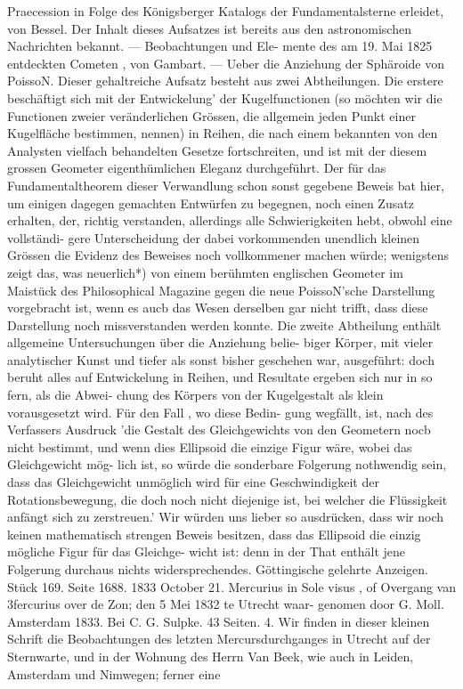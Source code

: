 \documentclass[12pt,a4paper]{article}
\begin{document}
{{{{{{{{Praecession  in  Folge  des  Königsberger  Katalogs  der  Fundamentalsterne  erleidet,  von  Bessel.  Der  Inhalt dieses  Aufsatzes  ist  bereits  aus  den  astronomischen  Nachrichten  bekannt.  ---  Beobachtungen  und  Ele- mente des  am  19.  Mai  1825  entdeckten  Cometen ,  von  Gambart. ---  Ueber  die  Anziehung  der  Sphäroide von  PoissoN.  Dieser  gehaltreiche  Aufsatz  besteht  aus  zwei  Abtheilungen.  Die  erstere  beschäftigt  sich mit  der  Entwickelung'  der  Kugelfunctionen  (so  möchten  wir  die  Functionen  zweier  veränderlichen  Grössen, die  allgemein  jeden  Punkt  einer  Kugelfläche  bestimmen,  nennen)  in  Reihen,  die  nach  einem  bekannten von  den  Analysten  vielfach  behandelten  Gesetze  fortschreiten,  und  ist  mit  der  diesem  grossen  Geometer eigenthümlichen  Eleganz  durchgeführt.  Der  für  das  Fundamentaltheorem  dieser  Verwandlung  schon sonst  gegebene  Beweis  bat  hier,  um  einigen  dagegen  gemachten  Entwürfen  zu  begegnen,  noch  einen Zusatz  erhalten,  der,  richtig  verstanden,  allerdings  alle  Schwierigkeiten  hebt,  obwohl  eine  vollständi- gere Unterscheidung  der  dabei  vorkommenden  unendlich  kleinen  Grössen  die  Evidenz  des  Beweises  noch vollkommener  machen  würde;  wenigstens  zeigt  das,  was  neuerlich*)  von  einem  berühmten  englischen Geometer  im  Maistück  des  Philosophical  Magazine  gegen  die  neue  PoissoN'sche  Darstellung  vorgebracht ist,  wenn  es  aucb  das  Wesen  derselben  gar  nicht  trifft,  dass  diese  Darstellung  noch  missverstanden werden  konnte.  Die  zweite  Abtheilung  enthält  allgemeine  Untersuchungen  über  die  Anziehung  belie- biger Körper,  mit  vieler  analytischer  Kunst  und  tiefer  als  sonst  bisher  geschehen  war,  ausgeführt:  doch beruht  alles  auf  Entwickelung  in  Reihen,  und  Resultate  ergeben  sich  nur  in  so  fern,  als  die  Abwei- chung des  Körpers  von  der  Kugelgestalt  als  klein  vorausgesetzt  wird.  Für  den  Fall ,  wo  diese  Bedin- gung wegfällt,  ist,  nach  des  Verfassers  Ausdruck  'die  Gestalt  des  Gleichgewichts  von  den  Geometern nocb  nicht  bestimmt,  und  wenn  dies  Ellipsoid  die  einzige  Figur  wäre,  wobei  das  Gleichgewicht  mög- lich ist,  so  würde  die  sonderbare  Folgerung  nothwendig  sein,  dass  das  Gleichgewicht  unmöglich  wird für  eine  Geschwindigkeit  der  Rotationsbewegung,  die  doch  noch  nicht  diejenige  ist,  bei  welcher  die Flüssigkeit  anfängt  sich  zu  zerstreuen.'  Wir  würden  uns  lieber  so  ausdrücken,  dass  wir  noch  keinen mathematisch  strengen  Beweis  besitzen,  dass  das  Ellipsoid  die  einzig  mögliche  Figur  für  das  Gleichge- wicht ist:  denn  in  der  That  enthält  jene  Folgerung  durchaus  nichts  widersprechendes. Göttingische  gelehrte  Anzeigen.     Stück  169.     Seite  1688.     1833  October  21. Mercurius  in  Sole  visus ,  of  Overgang  van  3fercurius  over  de  Zon;  den  5  Mei  1832  te  Utrecht  waar- genomen  door  G.  Moll.     Amsterdam  1833.     Bei  C.  G.  Sulpke.     43  Seiten.     4. Wir  finden  in  dieser  kleinen  Schrift  die  Beobachtungen  des  letzten  Mercursdurchganges  in  Utrecht auf  der  Sternwarte,  und  in  der  Wohnung  des  Herrn  Van  Beek,  wie  auch  in  Leiden,  Amsterdam  und Nimwegen;  ferner  eine  }}}}}}}}
\end{document}
